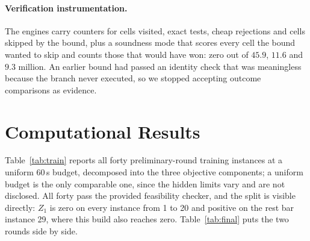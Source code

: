 \documentclass[runningheads]{llncs}
\begin{document}
\paragraph{Verification instrumentation.}
The engines carry counters for cells visited, exact tests, cheap rejections and cells skipped by
the bound, plus a soundness mode that scores every cell the bound wanted to skip and counts those
that would have won: zero out of $45.9$, $11.6$ and $9.3$ million. An earlier bound had passed an
identity check that was meaningless because the branch never executed, so we stopped accepting
outcome comparisons as evidence.

\section{Computational Results}

Table~\ref{tab:train} reports all forty preliminary-round training instances at a uniform $60$\,s
budget, decomposed into the three objective components; a uniform budget is the only comparable
one, since the hidden limits vary and are not disclosed. All forty pass the provided feasibility
checker, and the split is visible directly: $Z_1$ is zero on every instance from 1 to 20 and
positive on the rest bar instance 29, where this build also reaches zero.
Table~\ref{tab:final} puts the two rounds side by side.
\end{document}
